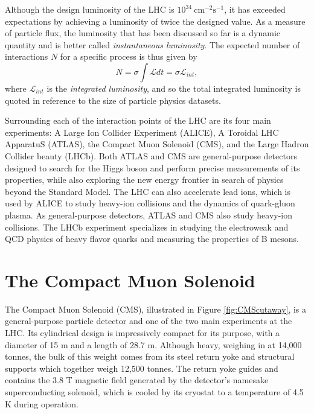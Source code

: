 Although the design luminosity of the LHC is $10^{34}\ \mathrm{cm}^{-2} \mathrm{s}^{-1}$, it has exceeded expectations by achieving a luminosity of twice the designed value. As a measure of particle flux, the luminosity that has been discussed so far is a dynamic quantity and is better called \textit{instantaneous luminosity}. The expected number of interactions $N$ for a specific process is thus given by
\begin{equation}
  N = \sigma \int \mathcal{L}dt = \sigma \mathcal{L}_{int},
\end{equation}
where $\mathcal{L}_{int}$ is the \textit{integrated luminosity}, and so the total integrated luminosity is quoted in reference to the size of particle physics datasets.

Surrounding each of the interaction points of the LHC are its four main experiments: A Large Ion Collider Experiment (ALICE), A Toroidal LHC ApparatuS (ATLAS), the Compact Muon Solenoid (CMS), and the Large Hadron Collider beauty (LHCb). Both ATLAS and CMS are general-purpose detectors designed to search for the Higgs boson and perform precise measurements of its properties, while also exploring the new energy frontier in search of physics beyond the Standard Model. The LHC can also accelerate lead ions, which is used by ALICE to study heavy-ion collisions and the dynamics of quark-gluon plasma. As general-purpose detectors, ATLAS and CMS also study heavy-ion collisions. The LHCb experiment specializes in studying the electroweak and QCD physics of heavy flavor quarks and measuring the properties of B mesons.

\section{The Compact Muon Solenoid}

The Compact Muon Solenoid (CMS), illustrated in Figure \ref{fig:CMScutaway}, is a general-purpose particle detector and one of the two main experiments at the LHC. Its cylindrical design is impressively compact for its purpose, with a diameter of 15 m and a length of 28.7 m. Although heavy, weighing in at 14,000 tonnes, the bulk of this weight comes from its steel return yoke and structural supports which together weigh 12,500 tonnes. The return yoke guides and contains the 3.8 T magnetic field generated by the detector's namesake superconducting solenoid, which is cooled by its cryostat to a temperature of 4.5 K during operation.

